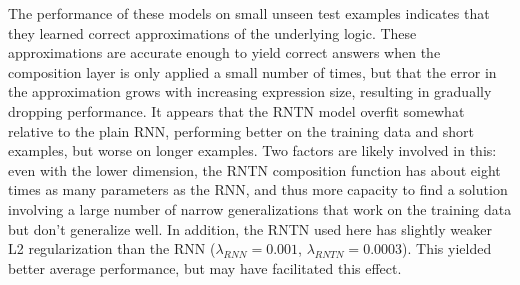 The performance of these models on small unseen test examples
indicates that they learned correct approximations of the underlying
logic. These approximations are accurate enough to yield
correct answers when the composition layer is only applied a small
number of times, but that the error in the approximation grows with
increasing expression size, resulting in gradually dropping performance. 
It appears that the RNTN model overfit somewhat relative to the plain RNN,
performing better on the training data and short examples, but worse on longer
examples. Two factors are likely involved in this: even with the lower dimension,
the RNTN composition function has about eight times as many parameters as the
RNN, and thus more capacity to find a solution involving a large number of narrow 
generalizations that work on the training data but don't generalize well. In addition,
the RNTN used here has slightly weaker L2 regularization than the 
RNN ($\lambda_{\textit{RNN}} = 0.001$, $\lambda_{\textit{RNTN}} = 0.0003$). This
yielded better average performance, but may have facilitated this effect.




